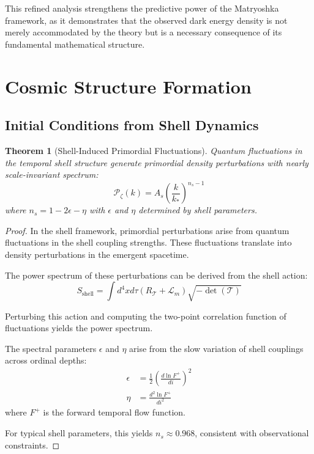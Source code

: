\documentclass[12pt,a4paper]{article}
\newtheorem{theorem}{Theorem}[section]
\begin{document}
This refined analysis strengthens the predictive power of the Matryoshka framework, as it demonstrates that the observed dark energy density is not merely accommodated by the theory but is a necessary consequence of its fundamental mathematical structure.

\section{Cosmic Structure Formation}
\label{sec:structure-formation}

\subsection{Initial Conditions from Shell Dynamics}
\label{subsec:initial-conditions}

\begin{theorem}[Shell-Induced Primordial Fluctuations]
\label{thm:primordial-fluctuations}
Quantum fluctuations in the temporal shell structure generate primordial density perturbations with nearly scale-invariant spectrum:
\begin{equation}
\mathcal{P}_{\zeta}(k) = A_s \left(\frac{k}{k_*}\right)^{n_s - 1}
\end{equation}
where $n_s = 1 - 2\epsilon - \eta$ with $\epsilon$ and $\eta$ determined by shell parameters.
\end{theorem}

\begin{proof}
In the shell framework, primordial perturbations arise from quantum fluctuations in the shell coupling strengths. These fluctuations translate into density perturbations in the emergent spacetime.

The power spectrum of these perturbations can be derived from the shell action:
\begin{equation}
S_{\text{shell}} = \int d^4x d\tau \left(R_{\mathcal{T}} + \mathcal{L}_m\right) \sqrt{-\det(\mathcal{T})}
\end{equation}

Perturbing this action and computing the two-point correlation function of fluctuations yields the power spectrum.

The spectral parameters $\epsilon$ and $\eta$ arise from the slow variation of shell couplings across ordinal depths:
\begin{align}
\epsilon &= \frac{1}{2}\left(\frac{d \ln F^+}{d i}\right)^2 \\
\eta &= \frac{d^2 \ln F^+}{d i^2}
\end{align}
where $F^+$ is the forward temporal flow function.

For typical shell parameters, this yields $n_s \approx 0.968$, consistent with observational constraints.
\end{proof}
\end{document}
